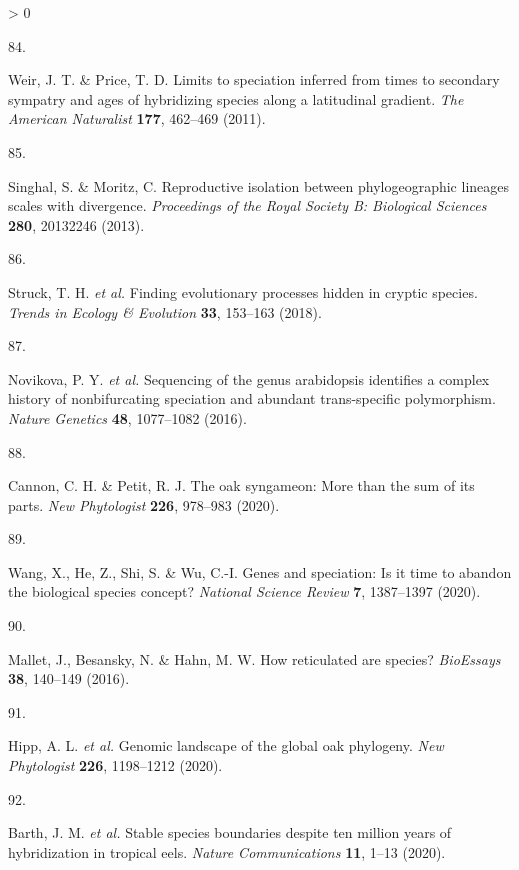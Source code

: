 \documentclass[
  11pt,
]{article}
\newlength{\cslhangindent}
\newlength{\csllabelwidth}
\newenvironment{CSLReferences}[2] %
 {%
  \setlength{\parindent}{0pt}
  \ifodd #1 \everypar{\setlength{\hangindent}{\cslhangindent}}\ignorespaces\fi
  \ifnum #2 > 0
  \setlength{\parskip}{#2\baselineskip}
  \fi
 }%
 {}
\newcommand{\CSLLeftMargin}[1]{\parbox[t]{\csllabelwidth}{#1}}
\newcommand{\CSLRightInline}[1]{\parbox[t]{\linewidth - \csllabelwidth}{#1}\break}
\begin{document}
\begin{CSLReferences}{0}{0}
\leavevmode\hypertarget{ref-weir2011limits}{}%
\CSLLeftMargin{84. }
\CSLRightInline{Weir, J. T. \& Price, T. D. Limits to speciation inferred from times to secondary sympatry and ages of hybridizing species along a latitudinal gradient. \emph{The American Naturalist} \textbf{177}, 462--469 (2011).}

\leavevmode\hypertarget{ref-singhal2013reproductive}{}%
\CSLLeftMargin{85. }
\CSLRightInline{Singhal, S. \& Moritz, C. Reproductive isolation between phylogeographic lineages scales with divergence. \emph{Proceedings of the Royal Society B: Biological Sciences} \textbf{280}, 20132246 (2013).}

\leavevmode\hypertarget{ref-struck2018finding}{}%
\CSLLeftMargin{86. }
\CSLRightInline{Struck, T. H. \emph{et al.} Finding evolutionary processes hidden in cryptic species. \emph{Trends in Ecology \& Evolution} \textbf{33}, 153--163 (2018).}

\leavevmode\hypertarget{ref-novikova2016sequencing}{}%
\CSLLeftMargin{87. }
\CSLRightInline{Novikova, P. Y. \emph{et al.} Sequencing of the genus arabidopsis identifies a complex history of nonbifurcating speciation and abundant trans-specific polymorphism. \emph{Nature Genetics} \textbf{48}, 1077--1082 (2016).}

\leavevmode\hypertarget{ref-cannon2020oak}{}%
\CSLLeftMargin{88. }
\CSLRightInline{Cannon, C. H. \& Petit, R. J. The oak syngameon: More than the sum of its parts. \emph{New Phytologist} \textbf{226}, 978--983 (2020).}

\leavevmode\hypertarget{ref-wang2020genes}{}%
\CSLLeftMargin{89. }
\CSLRightInline{Wang, X., He, Z., Shi, S. \& Wu, C.-I. Genes and speciation: Is it time to abandon the biological species concept? \emph{National Science Review} \textbf{7}, 1387--1397 (2020).}

\leavevmode\hypertarget{ref-mallet2016reticulated}{}%
\CSLLeftMargin{90. }
\CSLRightInline{Mallet, J., Besansky, N. \& Hahn, M. W. How reticulated are species? \emph{BioEssays} \textbf{38}, 140--149 (2016).}

\leavevmode\hypertarget{ref-hipp2020genomic}{}%
\CSLLeftMargin{91. }
\CSLRightInline{Hipp, A. L. \emph{et al.} Genomic landscape of the global oak phylogeny. \emph{New Phytologist} \textbf{226}, 1198--1212 (2020).}

\leavevmode\hypertarget{ref-barth2020stable}{}%
\CSLLeftMargin{92. }
\CSLRightInline{Barth, J. M. \emph{et al.} Stable species boundaries despite ten million years of hybridization in tropical eels. \emph{Nature Communications} \textbf{11}, 1--13 (2020).}


\end{CSLReferences}
\end{document}
